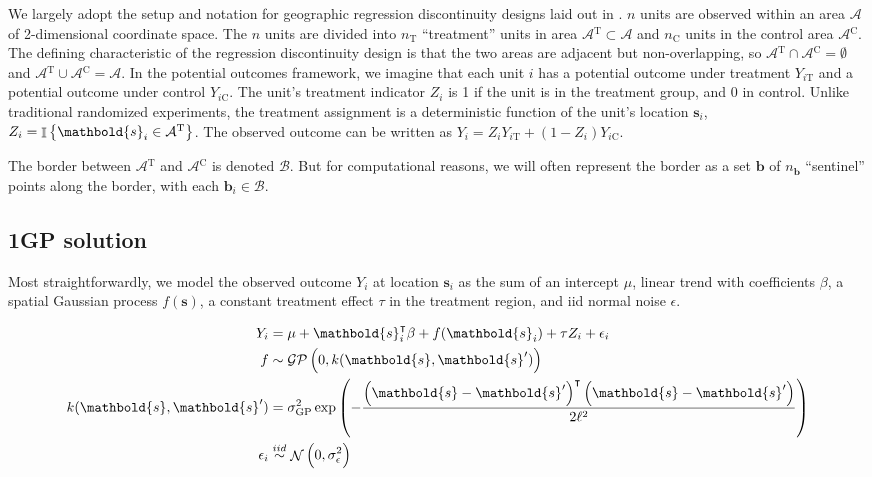 \documentclass[letter]{article}
\DeclareMathOperator{\Ind}{\mathbb{I}}
\DeclareMathOperator{\normal}{\mathcal{N}}
\newcommand{\gp}{\mathcal{GP}}
\newcommand{\trans}{^{\intercal}}
\newcommand{\area}{\mathcal{A}}
\newcommand{\treat}{\mathrm{T}}
\newcommand{\ctrol}{\mathrm{C}}
\newcommand{\treatind}{Z}
\newcommand{\treatarea}{\area{}^{\treat}}
\newcommand{\ctrolarea}{\area{}^{\ctrol}}
\newcommand{\sigmaf}{\sigma_{\mathrm{GP}}}
\newcommand{\svec}{\mathbold{s}}
\newcommand{\iid}{iid}
\newcommand{\boundary}{\mathcal{B}}
\newcommand{\sentinels}{\bm{b}}
\newcommand{\numsent}{n_{\sentinels}}
\renewcommand{\cite}[1]{\citep{#1}}
\begin{document}
We largely adopt the setup and notation for geographic regression discontinuity designs laid out in \cite{keele_titiunik_2015}.
\(n\) units are observed within an area \(\area\) of 2-dimensional coordinate space.
The \(n\) units are divided into \(n_\treat\) ``treatment'' units in area \(\treatarea \subset \area\)
and \(n_\ctrol\) units in the control area \(\ctrolarea\).
The defining characteristic of the regression discontinuity design is that the two areas are adjacent but non-overlapping, so \(\treatarea \cap \ctrolarea = \emptyset\) and \(\treatarea \cup \ctrolarea = \area\).
In the potential outcomes framework, we imagine that each unit \(i\) has a potential outcome under treatment \(Y_{i\treat}\) and a potential outcome under control \(Y_{i\ctrol}\).
The unit's treatment indicator \(\treatind_i\) is 1 if the unit is in the treatment group, and 0 in control.
Unlike traditional randomized experiments, the treatment assignment is a deterministic function of the unit's location \(\svec_i\), \(\treatind_i = \Ind\cbr{\svec_i \in \treatarea}\).
The observed outcome can be written as \(Y_i = \treatind_i Y_{i\treat} + (1 - \treatind_i) Y_{i\ctrol}\).

The border between \(\treatarea\) and \(\ctrolarea\) is denoted \(\boundary\).
But for computational reasons, we will often represent the border as a set \(\sentinels\) of \(\numsent\) ``sentinel'' points along the border, with each \(\sentinels_i \in \boundary\).
    


    	\subsection{1GP solution}\label{gp-solution}

Most straightforwardly, we model the observed outcome \(Y_i\) at location \(\svec_i\) as the sum of an intercept \(\mu\), linear trend with coefficients \(\beta\), a spatial Gaussian process \(f(\svec)\), a constant treatment effect \(\tau\) in the treatment region, and iid normal noise \(\epsilon\).

\begin{equation}\begin{split}
Y_i &= \mu+\svec_i\trans\beta + f(\svec_i) + \tau \treatind_i + \epsilon_i \\
f &\sim \gp\del{0, k(\svec, \svec')} \\
k(\svec,\svec') &= \sigmaf^2 \exp\del{ - \frac{\del{\svec-\svec'}\trans\del{\svec-\svec'}}{2 \ell^2}} \\
\epsilon_i &\overset{\iid}{\sim} \normal\del{0,\sigma_\epsilon^2}
\end{split}\end{equation}
\end{document}
